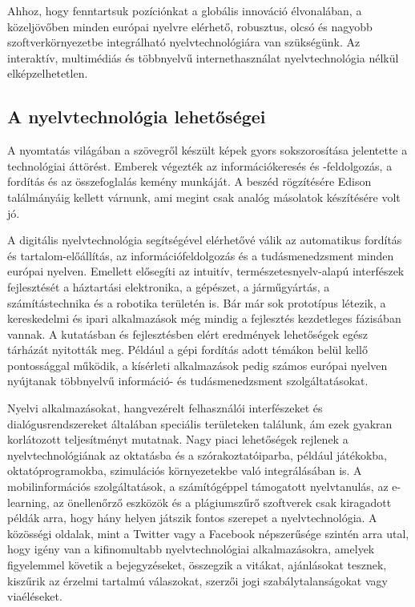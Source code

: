 \begin{multicols}{2}

  Ahhoz, hogy fenntartsuk pozíciónkat a globális innováció élvonalában, a kö\-zel\-jö\-vő\-ben minden európai nyelvre elérhető, robusztus, olcsó és nagyobb szoft\-ver\-kör\-nye\-zet\-be integrálható nyelvtechnológiára van szükségünk. Az interaktív, multimédiás és többnyelvű internethasználat nyelvtechnológia nélkül elképzelhetetlen. 

  \subsection{A nyelvtechnológia lehetőségei}

  A nyomtatás világában a szövegről készült képek gyors sokszorosítása jelentette a technológiai áttörést. Emberek végezték az információkeresés és -feldolgozás, a fordítás és az összefoglalás kemény mun\-ká\-ját. A beszéd rögzítésére Edison ta\-lál\-má\-nyá\-ig kellett várnunk, ami megint csak analóg másolatok készítésére volt jó. 

  A digitális nyelvtechnológia segítségével elérhetővé válik az automatikus fordítás és tartalom-előállítás, az információfeldolgozás és a tudásmenedzsment minden európai nyelven. Emellett elősegíti az intuitív, természetesnyelv-alapú interfészek fejlesztését a háztartási elektronika, a gépészet, a járműgyártás, a számítástechnika és a robotika területén is. Bár már sok prototípus létezik, a kereskedelmi és ipari alkalmazások még mindig a fejlesztés kezdetleges fázisában vannak. A kutatásban és fejlesztésben elért eredmények lehetőségek egész tárházát nyitották meg. Például a gépi fordítás adott témákon belül kellő pontossággal működik, a kísérleti alkalmazások pedig számos európai nyelven nyújtanak többnyelvű információ- és tudásmenedzsment szolgáltatásokat. 

  Nyelvi alkalmazásokat, hangvezérelt felhasználói interfészeket és dialógusrendszereket általában speciális területeken találunk, ám ezek gyakran korlátozott teljesítményt mutatnak. Nagy piaci le\-he\-tő\-sé\-gek rejlenek a nyelvtechnológiának az oktatásba és a szórakoztatóiparba, például játékokba, oktatóprogramokba, szimulációs környezetekbe való in\-teg\-rá\-lá\-sá\-ban is. A mobilinformációs szolgáltatások, a számítógéppel támogatott nyelvtanulás, az e-learning, az önellenőrző esz\-kö\-zök és a plágiumszűrő szoftverek csak kiragadott példák arra, hogy hány helyen játszik fontos szerepet a nyelvtechnológia. A közösségi oldalak, mint a Twitter vagy a Facebook népszerűsége szintén arra utal, hogy igény van a kifinomultabb nyelvtechnológiai alkalmazásokra, amelyek figyelemmel követik a bejegyzéseket, összegzik a vitákat, ajánlásokat tesznek, kiszűrik az érzelmi tartalmú válaszokat, szerzői jogi szabálytalanságokat vagy via\-élé\-se\-ket. 


\end{multicols}
